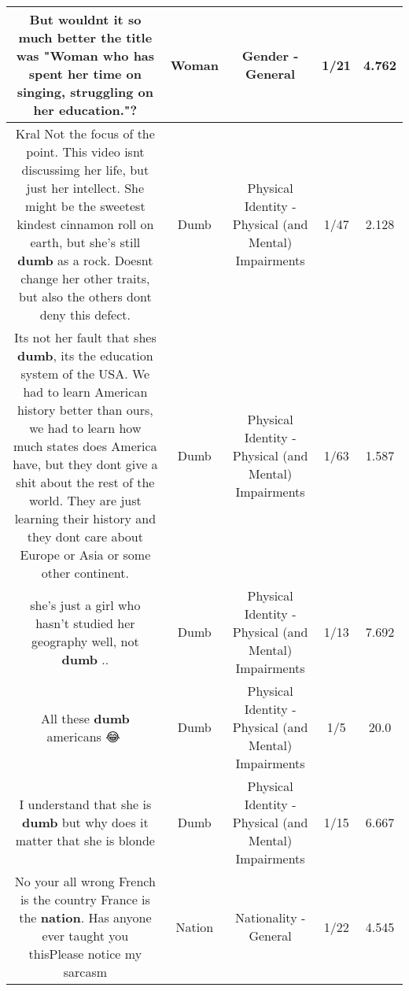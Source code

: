 \documentclass[11pt]{article}
\newlength\mylength
\begin{document}
\begin{center}
\begin{longtable}{|C{.65\mylength}|C{.30\mylength}|C{.12\mylength}|C{.12\mylength}|C{.12\mylength}|}
  \small But wouldnt it so much better the title was "\textbf{Woman} who has spent her time on singing, struggling on her education."?\normalsize   & Woman & Gender - General & 1/21 & 4.762 \\  \hline
  \small Kral Not the focus of the point. This video isnt discussimg her life, but just her intellect. She might be the sweetest kindest cinnamon roll on earth, but she's still \textbf{dumb} as a rock. Doesnt change her other traits, but also the others dont deny this defect.\normalsize   & Dumb & Physical Identity - Physical (and Mental) Impairments & 1/47 & 2.128 \\  \hline
  \small Its not her fault that shes \textbf{dumb}, its the education system of the USA. We had to learn American history better than ours, we had to learn how much states does America have, but they dont give a shit about the rest of the world. They are just learning their history and they dont care about Europe or Asia or some other continent.\normalsize   & Dumb & Physical Identity - Physical (and Mental) Impairments & 1/63 & 1.587 \\  \hline
  \small she's just a girl who hasn't studied her geography well, not \textbf{dumb} ..\normalsize   & Dumb & Physical Identity - Physical (and Mental) Impairments & 1/13 & 7.692 \\  \hline
  \small All these \textbf{dumb} americans 😂🤦\normalsize   & Dumb & Physical Identity - Physical (and Mental) Impairments & 1/5 & 20.0 \\  \hline
  \small I understand that she is \textbf{dumb} but why does it matter that she is blonde\normalsize   & Dumb & Physical Identity - Physical (and Mental) Impairments & 1/15 & 6.667 \\  \hline
  \small No your all wrong French is the country France is the \textbf{nation}. Has anyone ever taught you thisPlease notice my sarcasm\normalsize   & Nation & Nationality - General & 1/22 & 4.545 \\  \hline

\end{longtable}
\end{center}
\end{document}
